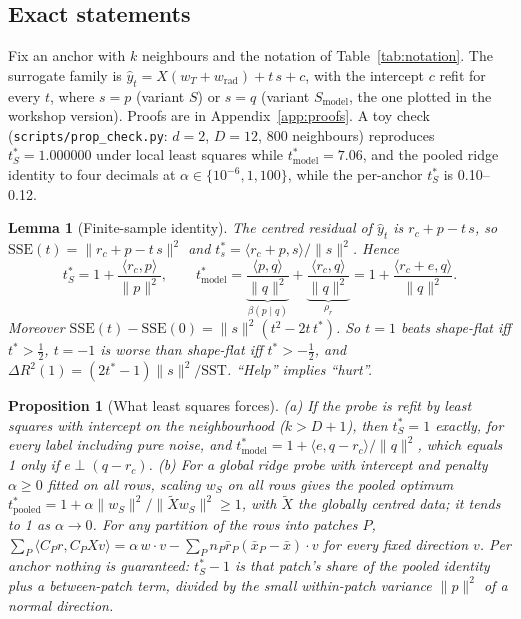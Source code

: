 \documentclass[10pt]{article}
\newtheorem{lemma}{Lemma}
\newtheorem{proposition}{Proposition}
\newcommand{\norm}[1]{\lVert #1 \rVert}
\newcommand{\tmodel}{t^*_{\mathrm{model}}}
\newcommand{\Smodel}{S_{\mathrm{model}}}
\begin{document}
\subsection{Exact statements}

Fix an anchor with $k$ neighbours and the notation of Table~\ref{tab:notation}. The surrogate family is $\hat y_t=X(w_T+w_{\mathrm{rad}})+t\,s+c$, with the intercept $c$ refit for every $t$, where $s=p$ (variant $S$) or $s=q$ (variant $\Smodel$, the one plotted in the workshop version). Proofs are in Appendix~\ref{app:proofs}. A toy check (\texttt{scripts/prop\_check.py}: $d=2$, $D=12$, 800 neighbours) reproduces $t^*_S=1.000000$ under local least squares while $\tmodel=7.06$, and the pooled ridge identity to four decimals at $\alpha\in\{10^{-6},1,100\}$, while the per-anchor $t^*_S$ is 0.10--0.12. %

\begin{lemma}[Finite-sample identity]\label{lem:identity}
The centred residual of $\hat y_t$ is $r_c+p-t\,s$, so $\mathrm{SSE}(t)=\norm{r_c+p-t\,s}^2$ and $t^*_s=\langle r_c+p,s\rangle/\norm{s}^2$. Hence
\[
t^*_S=1+\frac{\langle r_c,p\rangle}{\norm{p}^2},\qquad \tmodel=\underbrace{\frac{\langle p,q\rangle}{\norm{q}^2}}_{\beta(p\mid q)}+\underbrace{\frac{\langle r_c,q\rangle}{\norm{q}^2}}_{\rho_r}=1+\frac{\langle r_c+e,q\rangle}{\norm{q}^2}.
\]
Moreover $\mathrm{SSE}(t)-\mathrm{SSE}(0)=\norm{s}^2(t^2-2t\,t^*)$. So $t=1$ beats shape-flat iff $t^*>\tfrac12$, $t=-1$ is worse than shape-flat iff $t^*>-\tfrac12$, and $\Delta R^2(1)=(2t^*-1)\norm{s}^2/\mathrm{SST}$. ``Help'' implies ``hurt''.
\end{lemma}

\begin{proposition}[What least squares forces]\label{prop:ls}
(a) If the probe is refit by least squares with intercept on the neighbourhood ($k>D+1$), then $t^*_S=1$ exactly, for every label including pure noise, and $\tmodel=1+\langle e,q-r_c\rangle/\norm{q}^2$, which equals 1 only if $e\perp(q-r_c)$.
(b) For a global ridge probe with intercept and penalty $\alpha\ge0$ fitted on all rows, scaling $w_S$ on all rows gives the pooled optimum $t^*_{\mathrm{pooled}}=1+\alpha\norm{w_S}^2/\norm{\tilde Xw_S}^2\ge1$, with $\tilde X$ the globally centred data; it tends to 1 as $\alpha\to0$. For any partition of the rows into patches $P$, $\sum_P\langle C_Pr,C_PXv\rangle=\alpha\,w\cdot v-\sum_Pn_P\bar r_P(\bar x_P-\bar x)\cdot v$ for every fixed direction $v$. Per anchor nothing is guaranteed: $t^*_S-1$ is that patch's share of the pooled identity plus a between-patch term, divided by the small within-patch variance $\norm{p}^2$ of a normal direction.
\end{proposition}
\end{document}
